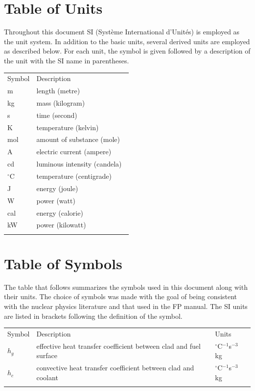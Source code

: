 \documentclass[preprint, 10pt]{sigplanconf}
\begin{document}
\section*{Table of Units}
\label{Sec:ToU}
Throughout this document SI (Syst\`{e}me International
d'Unit\'{e}s) is employed as the unit system. In addition to
the basic units, several derived units are employed as
described below. For each unit, the symbol is given followed
by a description of the unit with the SI name in
parentheses.
\begin{longtable}{l p{8.5cm}}
Symbol & Description\
\\
m & length (metre)\
\\
kg & mass (kilogram)\
\\
s & time (second)\
\\
K & temperature (kelvin)\
\\
mol & amount of substance (mole)\
\\
A & electric current (ampere)\
\\
cd & luminous intensity (candela)\
\\
${}^{\circ}$C & temperature (centigrade)\
\\
J & energy (joule)\
\\
W & power (watt)\
\\
cal & energy (calorie)\
\\
kW & power (kilowatt)\
\\
\label{Table:ToU}
\end{longtable}
\section*{Table of Symbols}
\label{Sec:ToS}
The table that follows summarizes the symbols used in this document along with
their units. The choice of symbols was made with the goal of being consistent
with the nuclear physics literature and that used in the FP manual. The SI units
are listed in brackets following the definition of the symbol.
\begin{longtable}{l l p{8.5cm}}
Symbol & Description & Units\
\\
$h_{g}$ & effective heat transfer coefficient between clad
and fuel surface & ${}^{\circ}$C$^{-1}$s$^{-3}$kg\
\\
$h_{c}$ & convective heat transfer coefficient between clad
and coolant & ${}^{\circ}$C$^{-1}$s$^{-3}$kg\
\\
\label{Table:ToS}
\end{longtable}
\end{document}
